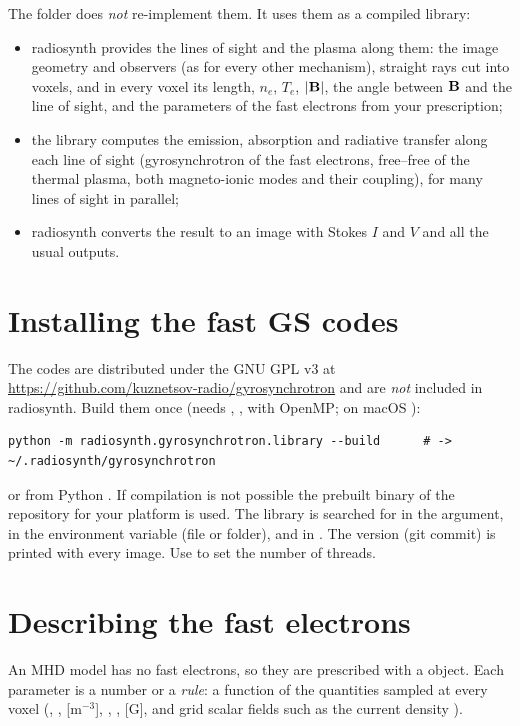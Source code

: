 The  folder does \emph{not} re-implement them. It uses them as a
compiled library:
\begin{itemize}[itemsep=1pt]
\item radiosynth provides the lines of sight and the plasma along them: the image
  geometry and observers (as for every other mechanism), straight rays cut into voxels,
  and in every voxel its length, $n_e$, $T_e$, $|\mathbf{B}|$, the angle between $\mathbf{B}$
  and the line of sight, and the parameters of the fast electrons from your prescription;
\item the library computes the emission, absorption and radiative transfer along each
  line of sight (gyrosynchrotron of the fast electrons, free--free of the thermal plasma,
  both magneto-ionic modes and their coupling), for many lines of sight in parallel;
\item radiosynth converts the result to an image with Stokes $I$ and $V$ and all the usual
  outputs.
\end{itemize}

\section{Installing the fast GS codes}
The codes are distributed under the GNU GPL v3 at
\url{https://github.com/kuznetsov-radio/gyrosynchrotron} and are \emph{not} included in
radiosynth. Build them once (needs , ,  with OpenMP; on
macOS ):
\begin{lstlisting}
python -m radiosynth.gyrosynchrotron.library --build      # -> ~/.radiosynth/gyrosynchrotron
\end{lstlisting}
or from Python . If compilation is not possible
the prebuilt binary of the repository for your platform is used. The library is searched
for in the  argument, in the environment variable
 (file or folder), and in .
The version (git commit) is printed with every image. Use  to set
the number of threads.

\section{Describing the fast electrons}
An MHD model has no fast electrons, so they are prescribed with a
 object. Each parameter is a number or a \emph{rule}: a function of the
quantities sampled at every voxel (, ,  [m$^{-3}$],
, ,  [G], and grid scalar fields such as the current density
).

